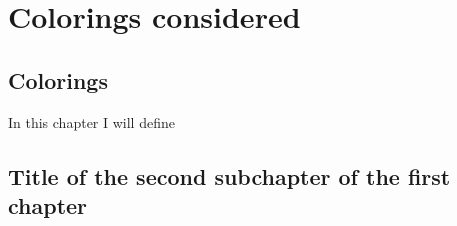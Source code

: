\chapter{Colorings considered}

\section{Colorings}

In this chapter I will define 

\section{Title of the second subchapter of the first chapter}
